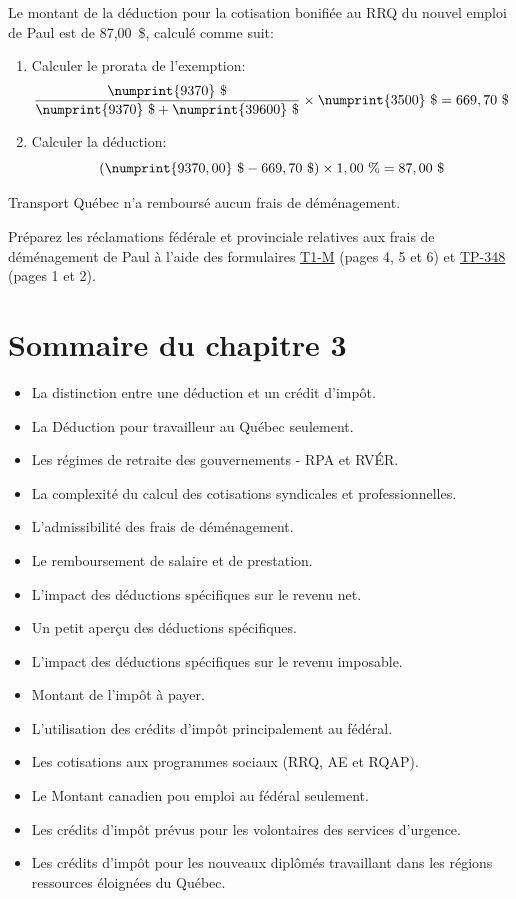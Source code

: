 \begin{question}
	Le montant de la déduction pour la cotisation bonifiée au RRQ du nouvel emploi de Paul est de 87,00~\$, calculé comme suit:
	\begin{enumerate}
		\item Calculer le prorata de l'exemption:
		\[ \frac{\numprint{9370}~\$}{\numprint{9370}~\$ + \numprint{39600}~\$} \times \numprint{3500}~\$ = 669,70~\$ \]
		\item 	Calculer la déduction:
		\[ (\numprint{9370,00}~\$ - 669,70~\$) \times 1,00~\% = 87,00~\$ \]
	\end{enumerate}
	
	Transport Québec n'a remboursé aucun frais de déménagement.
	
	Préparez les réclamations fédérale et provinciale relatives aux frais de déménagement de Paul à l'aide des formulaires \href{https://www.canada.ca/fr/agence-revenu/services/formulaires-publications/formulaires/t1-m.html}{T1-M} (pages 4, 5 et 6) et \href{https://www.revenuquebec.ca/fr/services-en-ligne/formulaires-et-publications/details-courant/tp-348/}{TP-348} (pages 1 et 2).
\end{question}

\section{Sommaire du chapitre 3}
\begin{itemize}
	\item La distinction entre une déduction et un crédit d'impôt.
	\item La \og Déduction pour travailleur \fg{} au Québec seulement.
	\item Les régimes de retraite des gouvernements - RPA et RVÉR.
	\item La complexité du calcul des cotisations syndicales et professionnelles.
	\item L'admissibilité des frais de déménagement.
	\item Le remboursement de salaire et de prestation.
	\item L'impact des déductions spécifiques sur le revenu net.
	\item Un petit aperçu des déductions spécifiques.
	\item L'impact des déductions spécifiques sur le revenu imposable.
	\item Montant de l'impôt à payer.
	\item L'utilisation des crédits d'impôt principalement au fédéral.
	\item Les cotisations aux programmes sociaux (RRQ, AE et RQAP).
	\item Le \og Montant canadien pou emploi \fg{} au fédéral seulement.
	\item Les crédits d'impôt prévus pour les volontaires des services d'urgence.
	\item Les crédits d'impôt pour les nouveaux diplômés travaillant dans les régions ressources éloignées du Québec.
\end{itemize}

